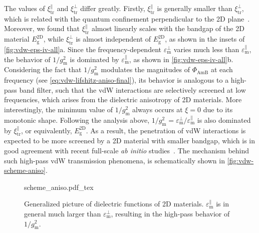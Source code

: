 The values of $\xi_{\mathrm{tr}}^{\parallel}$ and
$\xi_{\mathrm{tr}}^{\perp}$ differ greatly.
%
Firstly, \(\xi_{\mathrm{tr}}^{\parallel}\) is generally smaller than
\(\xi_{\mathrm{tr}}^{\perp}\), which is related with the quantum
confinement perpendicular to the 2D
plane~\cite{Matthes_2016_effective_PRB}.
%
Moreover, we found that $\xi_{\mathrm{tr}}^{\parallel}$ almost
linearly scales with the bandgap of the 2D material
$E_{\mathrm{g}}^{\mathrm{2D}}$, while $\xi_{\mathrm{tr}}^{\perp}$ is
almost independent of $E_{\mathrm{g}}^{\mathrm{2D}}$, as shown in the insets of \autoref{fig:vdw-eps-iv-all}a.
%
Since the frequency-dependent $\varepsilon_{\mathrm{m}}^{\perp}$ varies
much less than $\varepsilon_{\mathrm{m}}^{\parallel}$, the behavior of
\(1/g_{\mathrm{m}}^{2}\) is dominated by
$\varepsilon_{\mathrm{m}}^{\parallel}$, as shown in
\autoref{fig:vdw-eps-iv-all}b.
%
Considering the fact that $1/g_{\mathrm{m}}^{2}$ modulates the
magnitudes of $\Phi_{\mathrm{AmB}}$ at each frequency (see
\autoref{eq:vdw-lifshitz-aniso-final}), its behavior is analogous to a
high-pass band filter, such that the vdW interactions are selectively screened at low
frequencies, which arises from the dielectric anisotropy of 2D
materials.
%
More interestingly, the minimum value of $1/g_{\mathrm{m}}^{2}$ always
occurs at $\xi = 0$ due to its monotonic shape.
%
Following the analysis above, 
$1/g_{\mathrm{m}}^{2}=\varepsilon_{\mathrm{m}}^{\perp} /
\varepsilon_{\mathrm{m}}^{\parallel}$ is also dominated by $\xi_{\mathrm{tr}}^{\parallel}$, or equivalently,
$E_{\mathrm{g}}^{\mathrm{2D}}$.
%
As a result, the penetration of vdW interactions is expected to be
more screened by a 2D material with smaller bandgap, which is in good
agreement with recent full-scale {\itshape ab initio}
studies~\cite{Liu_2018_gr}.
%
The mechanism behind such high-pass vdW transmission phenomena, is
schematically shown in \autoref{fig:vdw-scheme-aniso}.
\begin{figure}[!htbp]
  \centering{}
  {scheme_aniso.pdf_tex}
  \caption{\label{fig:vdw-scheme-aniso} %
    Generalized picture of dielectric functions of 2D
    materials. $\varepsilon_{\mathrm{m}}^{\parallel}$ is in general
    much larger than $\varepsilon_{\mathrm{m}}^{\perp}$, resulting in
    the high-pass behavior of $1/g_{\mathrm{m}}^{2}$.  }
\end{figure}



